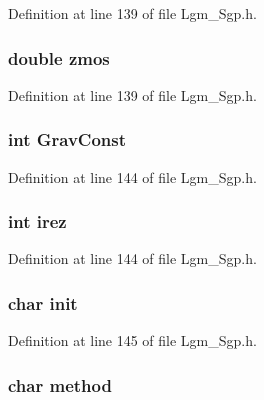 Definition at line 139 of file Lgm\_\-Sgp.h.\hypertarget{struct___sgp_info_1840b955ac5e5eb7d015f46051df589f}{
\subsubsection[{zmos}]{\setlength{\rightskip}{0pt plus 5cm}double {\bf zmos}}}
\label{struct___sgp_info_1840b955ac5e5eb7d015f46051df589f}




Definition at line 139 of file Lgm\_\-Sgp.h.\hypertarget{struct___sgp_info_a69491b0e6ccf4560cce706b1e089e24}{
\subsubsection[{GravConst}]{\setlength{\rightskip}{0pt plus 5cm}int {\bf GravConst}}}
\label{struct___sgp_info_a69491b0e6ccf4560cce706b1e089e24}




Definition at line 144 of file Lgm\_\-Sgp.h.\hypertarget{struct___sgp_info_2d01b296d1d4611e60cda302675ef46e}{
\subsubsection[{irez}]{\setlength{\rightskip}{0pt plus 5cm}int {\bf irez}}}
\label{struct___sgp_info_2d01b296d1d4611e60cda302675ef46e}




Definition at line 144 of file Lgm\_\-Sgp.h.\hypertarget{struct___sgp_info_6a9691d2260a0c4c1a531b79d708520a}{
\subsubsection[{init}]{\setlength{\rightskip}{0pt plus 5cm}char {\bf init}}}
\label{struct___sgp_info_6a9691d2260a0c4c1a531b79d708520a}




Definition at line 145 of file Lgm\_\-Sgp.h.\hypertarget{struct___sgp_info_e16a2e07e3ca49c3c4bd592efbf1b5ed}{
\subsubsection[{method}]{\setlength{\rightskip}{0pt plus 5cm}char {\bf method}}}
\label{struct___sgp_info_e16a2e07e3ca49c3c4bd592efbf1b5ed}




